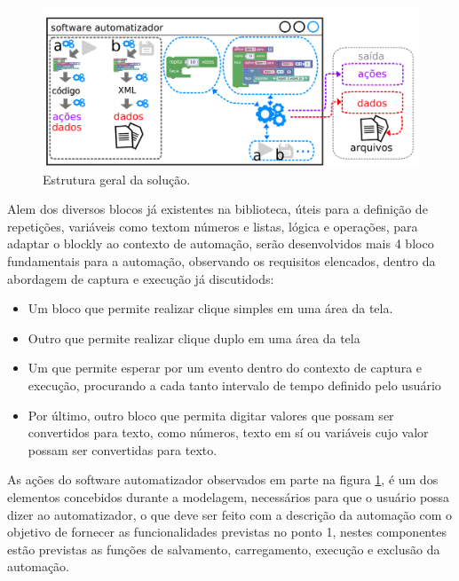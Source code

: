\documentclass[tg]{mdtufsm}
\begin{document}
                \begin{figure}[!htb]
                    {\centering
                    \includegraphics[width=1.0\textwidth]{imagens/blocklyDiagram}
                    \caption{Estrutura geral da solução.}
                    \label{fig:blocklyDiagram}}
                \end{figure}

                Alem dos diversos blocos já existentes na biblioteca, úteis para a definição de repetições, variáveis como textom números e listas, lógica e operações, para adaptar o blockly ao contexto de automação, serão desenvolvidos mais 4 bloco fundamentais para a automação, observando os requisitos elencados, dentro da abordagem de captura e execução já discutidods:

                \begin{itemize}
                    \item Um bloco que permite realizar clique simples em uma área da tela.
                    \item Outro que permite realizar clique duplo em uma área da tela
                    \item Um que permite esperar por um evento dentro do contexto de captura e execução, procurando a cada tanto intervalo de tempo definido pelo usuário
                    \item Por último, outro bloco que permita digitar valores que possam ser convertidos para texto, como números, texto em sí ou variáveis cujo valor possam ser convertidas para texto.
                \end{itemize}

                As ações do software automatizador observados em parte na figura \ref{fig:blocklyDiagram}, é um dos elementos concebidos durante a modelagem, necessários para que o usuário possa dizer ao automatizador, o que deve ser feito com a descrição da automação com o objetivo de fornecer as funcionalidades previstas no ponto 1, nestes componentes estão previstas as funções de salvamento, carregamento, execução e exclusão da automação.
\end{document}
